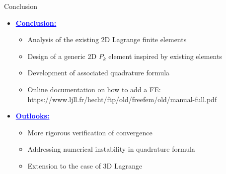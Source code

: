 \documentclass[8pt, xcolor=table,aspectratio=169]{beamer}
\begin{document}
\begin{frame}{Conclusion}{}
  \begin{center}
    
  \begin{itemize}[label={},itemsep=2em]
    \item \textcolor{blue}{\Large\textbf{\underline{Conclusion:}}}
    \begin{itemize}[label=$\square$,itemsep=1em]
      \item Analysis of the existing 2D  Lagrange finite elements
      \item Design of a generic 2D $P_k$  element inspired by existing elements
      \item Development of associated quadrature formula
      \item Online documentation on how to add a FE: https://www.ljll.fr/hecht/ftp/old/freefem/old/manual-full.pdf
    \end{itemize}
    \item \textcolor{blue}{\Large\textbf{\underline{Outlooks:}}}
      \begin{itemize}[label=$\square$,itemsep=1em]
      \item More rigorous verification of convergence
      \item Addressing numerical instability in quadrature formula
      \item Extension to the case of 3D Lagrange
      \end{itemize}
  \end{itemize}
  \end{center}

\end{frame}
\end{document}
